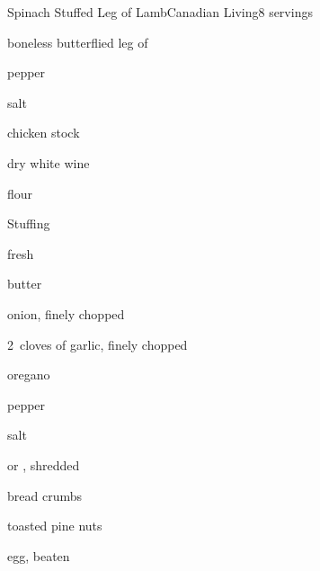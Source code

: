\begin{recipe}{Spinach Stuffed Leg of Lamb}{Canadian Living}{8 servings}

\begin{ingredients}
\item {} boneless butterflied leg of 
\item \tp{\half} pepper
\item \tp{\quarter} salt
\item {} chicken stock
\item \C{\quarter} dry white wine
\item {} flour
\end{ingredients}

Stuffing
\begin{ingredients}
\item {} fresh 
\item {} butter
\item onion, finely chopped
\item 2~cloves of garlic, finely chopped
\item {} oregano
\item \tp{\half} pepper
\item \tp{\quarter} salt
\item \C{\half}  or , shredded 
\item \C{\half} bread crumbs
\item \C{\third} toasted pine nuts
\item egg, beaten
\end{ingredients}


\end{recipe}
